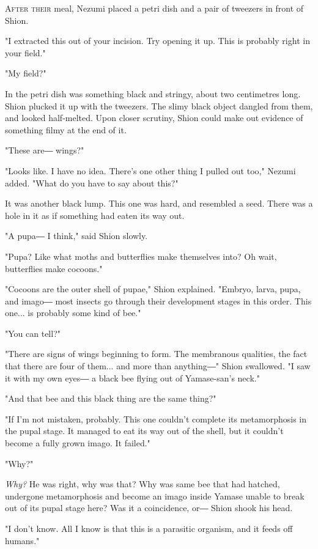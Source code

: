 \lettrine{A}{fter their} meal, Nezumi placed a petri dish and a pair of tweezers in
front of Shion.

"I extracted this out of your incision. Try opening it up. This is
probably right in your field."

"My field?"

In the petri dish was something black and stringy, about two centimetres
long. Shion plucked it up with the tweezers. The slimy black object
dangled from them, and looked half-melted. Upon closer scrutiny, Shion
could make out evidence of something filmy at the end of it.

"These are― wings?"

"Looks like. I have no idea. There's one other thing I pulled out too,"
Nezumi added. "What do you have to say about this?"

It was another black lump. This one was hard, and resembled a seed.
There was a hole in it as if something had eaten its way out.

"A pupa― I think," said Shion slowly.

"Pupa? Like what moths and butterflies make themselves into? Oh wait,
butterflies make cocoons."

"Cocoons are the outer shell of pupae," Shion explained. "Embryo, larva,
pupa, and imago― most insects go through their development stages in
this order. This one... is probably some kind of bee."

"You can tell?"

"There are signs of wings beginning to form. The membranous qualities,
the fact that there are four of them... and more than anything―" Shion
swallowed. "I saw it with my own eyes― a black bee flying out of
Yamase-san's neck."

"And that bee and this black thing are the same thing?"

"If I'm not mistaken, probably. This one couldn't complete its
metamorphosis in the pupal stage. It managed to eat its way out of the
shell, but it couldn't become a fully grown imago. It failed."

"Why?"

\emph{Why?} He was right, why was that? Why was same bee that had hatched,
undergone metamorphosis and become an imago inside Yamase unable to
break out of its pupal stage here? Was it a coincidence, or― Shion shook
his head.

"I don't know. All I know is that this is a parasitic organism, and it
feeds off humans."

